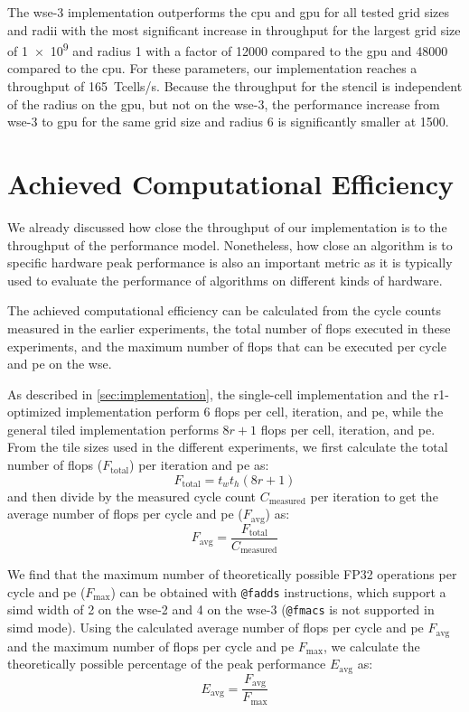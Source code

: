 The \ac{wse}-3 implementation outperforms the \ac{cpu} and \ac{gpu} for all tested grid sizes and radii with the most significant increase in throughput for the largest grid size of \num{1e9} and radius \num{1} with a factor of \num{12000} compared to the \ac{gpu} and \num{48000} compared to the \ac{cpu}. For these parameters, our implementation reaches a throughput of \qty{165}{\tera cells/s}. Because the throughput for the stencil is independent of the radius on the \ac{gpu}, but not on the \ac{wse}-3, the performance increase from \ac{wse}-3 to \ac{gpu} for the same grid size and radius \num{6} is significantly smaller at \num{1500}.

\section{Achieved Computational Efficiency}
We already discussed how close the throughput of our implementation is to the throughput of the performance model.
Nonetheless, how close an algorithm is to specific hardware peak performance is also an important metric as it is typically used to evaluate the performance of algorithms on different kinds of hardware.

The achieved computational efficiency can be calculated from the cycle counts measured in the earlier experiments, the total number of \acp{flop} executed in these experiments, and the maximum number of \acp{flop} that can be executed per cycle and \ac{pe} on the \ac{wse}.

As described in \autoref{sec:implementation}, the single-cell implementation and the r1-optimized implementation perform \num{6} \acp{flop} per cell, iteration, and \ac{pe}, while the general tiled implementation performs $8r+1$ \acp{flop} per cell, iteration, and \ac{pe}. From the tile sizes used in the different experiments, we first calculate the total number of \acp{flop} ($F_{\mathrm{total}}$) per iteration and \ac{pe} as:
\begin{equation}
    F_{\mathrm{total}} = t_w t_h (8r+1)
\end{equation}
and then divide by the measured cycle count $C_{\mathrm{measured}}$ per iteration to get the average number of \acp{flop} per cycle and \ac{pe} ($F_{\mathrm{avg}}$) as:
\begin{equation}
    F_{\mathrm{avg}} = \frac{F_{\mathrm{total}}}{C_{\mathrm{measured}}}
\end{equation}

We find that the maximum number of theoretically possible FP32 operations per cycle and \ac{pe} ($F_{\mathrm{max}}$) can be obtained with \texttt{@fadds} instructions, which support a \ac{simd} width of 2 on the \ac{wse}-2 and 4 on the \ac{wse}-3 (\texttt{@fmacs} is not supported in \ac{simd} mode). Using the calculated average number of \acp{flop} per cycle and \ac{pe} $F_{\mathrm{avg}}$ and the maximum number of \acp{flop} per cycle and \ac{pe} $F_{\mathrm{max}}$, we calculate the theoretically possible percentage of the peak performance $E_{\mathrm{avg}}$ as:
\begin{equation}
    E_{\mathrm{avg}} = \frac{F_{\mathrm{avg}}}{F_{\mathrm{max}}}
\end{equation}

